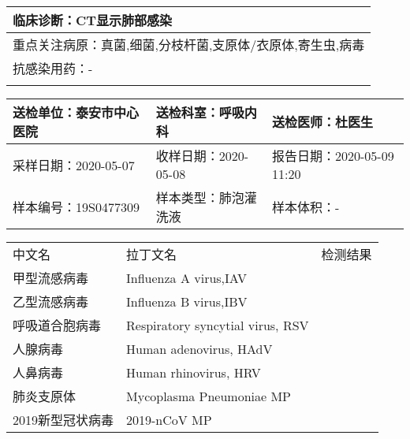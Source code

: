 \documentclass[UTF8]{ctexart}
\begin{document}
\begin{table}[H]
{\begin{tabular}{|p{}|p{}|p{}|p{}|}
		\multicolumn{4}{|p{\textwidth}|}{临床诊断：CT显示肺部感染} \\
		\hline
		\multicolumn{4}{|p{\textwidth}|}{重点关注病原：真菌,细菌,分枝杆菌,支原体/衣原体,寄生虫,病毒} \\
		\hline
		\multicolumn{4}{|p{\textwidth}|}{抗感染用药：-} \\
		\hline
		\rowcolor{mygray}\multicolumn{4}{|c|}{样本信息} \\
		\end{tabular}
		\begin{tabular}{|p{}|p{}|p{}|} %
		\hline
		送检单位：泰安市中心医院 & 送检科室：呼吸内科 & 送检医师：杜医生  \\
		\hline
		采样日期：2020-05-07 & 收样日期：2020-05-08 & 报告日期：2020-05-09 11:20 \\
		\hline
		样本编号：19S0477309 & 样本类型：肺泡灌洗液 &  样本体积：-  \\
	    \hline
		\end{tabular}
		\begin{tabular}{|p{}<{\centering}|p{}<{\centering}|p{}<{\centering}|} %
		\rowcolor{mygray}\multicolumn{3}{|c|}{检测结果} \\
		\hline
		中文名 & 拉丁文名 & 检测结果\\	
		\hline	
		甲型流感病毒 & Influenza A virus,IAV &  \\
		\hline
		乙型流感病毒 & Influenza B virus,IBV &  \\
		\hline
		呼吸道合胞病毒 & Respiratory syncytial virus, RSV &  \\
		\hline
		人腺病毒 & Human adenovirus, HAdV & \\
		\hline
		人鼻病毒 & Human rhinovirus, HRV &  \\
		\hline
		肺炎支原体 & Mycoplasma Pneumoniae MP & \\
		\hline
		2019新型冠状病毒  & 2019-nCoV MP &  \\
		\hline
		\end{tabular}}
		\end{table}
		\newpage
		\topskip 0.1cm	
\end{document}
